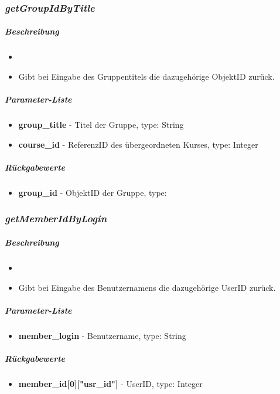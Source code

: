 \subsubsection*{\textit{getGroupIdByTitle}}\label{getGroupIdByTitleMGUI}
\subparagraph{Beschreibung}
\begin{itemize}
	\item[] \noindent{} 
	\item[] Gibt bei Eingabe des Gruppentitels die dazugehörige ObjektID zurück.
\end{itemize}
\subparagraph{Parameter-Liste}
\begin{itemize}
	\item[] \textbf{group\_title} - Titel der Gruppe, type: String
	\item[] \textbf{course\_id} - ReferenzID des übergeordneten Kurses, type: Integer
\end{itemize}
\subparagraph{Rückgabewerte}
\begin{itemize}
	\item[] \textbf{group\_id} - ObjektID der Gruppe, type:
\end{itemize}

\subsubsection*{\textit{getMemberIdByLogin}}\label{getMemberIdByLoginMGUI}
\subparagraph{Beschreibung}
\begin{itemize}
	\item[] \noindent{} 
	\item[] Gibt bei Eingabe des Benutzernamens die dazugehörige UserID zurück.	
\end{itemize}
\subparagraph{Parameter-Liste}
\begin{itemize}
	\item[] \textbf{member\_login} - Benutzername, type: String
\end{itemize}
\subparagraph{Rückgabewerte}
\begin{itemize}
	\item[] \textbf{member\_id[0]["usr\_id"]} - UserID, type: Integer
\end{itemize}

